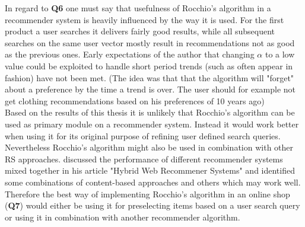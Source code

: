 In regard to \textbf{Q6} one must say that usefulness of Rocchio's algorithm in a recommender system is heavily influenced by the way it is used.
For the first product a user searches it delivers fairly good results, while all subsequent searches on the same user vector mostly result in recommendations not as good as the previous ones.
Early expectations of the author that changing $\alpha$ to a low value could be exploited to handle short period trends (such as often appear in fashion) have not been met.
(The idea was that that the algorithm will "forget" about a preference by the time a trend is over. The user should for example not get clothing recommendations based on his preferences of 10 years ago)
\\

Based on the results of this thesis it is unlikely that Rocchio's algorithm can be used as primary module on a recommender system.
Instead it would work better when using it for its original purpose of refining user defined search queries.
Nevertheless Rocchio's algorithm might also be used in combination with other RS approaches.
\citeauthor{burke:2007} discussed the performance of different recommender systems mixed together in his article "Hybrid Web Recommener Systems" and identified some combinations of content-based approaches and others which may work well.
Therefore the best way of implementing Rocchio's algorithm in an online shop (\textbf{Q7}) would either be using it for preselecting items based on a user search query or using it in combination with another recommender algorithm.

